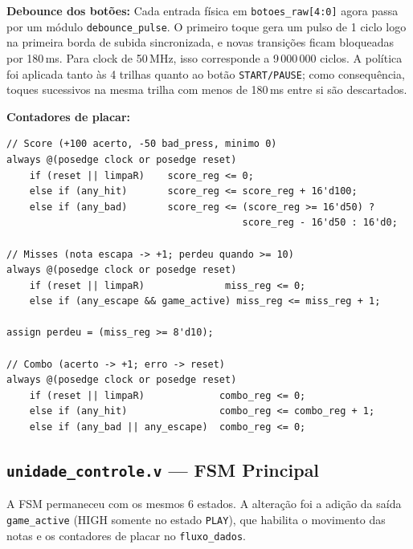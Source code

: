 \documentclass[12pt,a4paper]{article}
\begin{document}
\textbf{Debounce dos botões:} Cada entrada física em \texttt{botoes\_raw[4:0]} agora passa por um módulo \texttt{debounce\_pulse}. O primeiro toque gera um pulso de 1 ciclo logo na primeira borda de subida sincronizada, e novas transições ficam bloqueadas por 180\,ms. Para clock de 50\,MHz, isso corresponde a 9\,000\,000 ciclos. A política foi aplicada tanto às 4 trilhas quanto ao botão \texttt{START/PAUSE}; como consequência, toques sucessivos na mesma trilha com menos de 180\,ms entre si são descartados.

\textbf{Contadores de placar:}

\begin{lstlisting}[style=verilog, caption={Lógica dos contadores de pontuação no \texttt{fluxo\_dados.v}.}]
// Score (+100 acerto, -50 bad_press, minimo 0)
always @(posedge clock or posedge reset)
    if (reset || limpaR)    score_reg <= 0;
    else if (any_hit)       score_reg <= score_reg + 16'd100;
    else if (any_bad)       score_reg <= (score_reg >= 16'd50) ?
                                         score_reg - 16'd50 : 16'd0;

// Misses (nota escapa -> +1; perdeu quando >= 10)
always @(posedge clock or posedge reset)
    if (reset || limpaR)              miss_reg <= 0;
    else if (any_escape && game_active) miss_reg <= miss_reg + 1;

assign perdeu = (miss_reg >= 8'd10);

// Combo (acerto -> +1; erro -> reset)
always @(posedge clock or posedge reset)
    if (reset || limpaR)             combo_reg <= 0;
    else if (any_hit)                combo_reg <= combo_reg + 1;
    else if (any_bad || any_escape)  combo_reg <= 0;
\end{lstlisting}

\subsection{\texttt{unidade\_controle.v} — FSM Principal}

A FSM permaneceu com os mesmos 6 estados. A alteração foi a adição da saída \texttt{game\_active} (HIGH somente no estado \texttt{PLAY}), que habilita o movimento das notas e os contadores de placar no \texttt{fluxo\_dados}.
\end{document}
